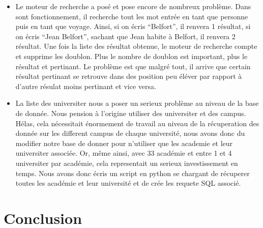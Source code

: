 \documentclass[a4paper,10pt]{report}
\begin{document}

\begin{itemize}
    \item Le moteur de recherche a pos\'e et pose encore de nombreux probl\`eme.
    Dans sont fonctionnement, il recherche tout les mot entr\'ee en tant que
    personne puis en tant que voyage. Ainsi, si on \'ecris ``Belfort'', il renvera 1 r\'esultat,
    si on \'ecris ``Jean Belfort'', sachant que Jean habite \`a Belfort, il renvera 2 r\'esultat.
    Une fois la liste des r\'esultat obtenue, le moteur de recherche compte et supprime
    les doublon. Plus le nombre de doublon est important, plus le r\'esultat et pertinant.
    Le probl\`eme est que malgr\'e tout, il arrive que certain r\'esultat pertinant se
    retrouve dans des position peu \'el\'ever par rapport \`a d'autre r\'esulat moins pertinant
    et vice versa.
    
    \null
    
    \item La liste des universiter nous a poser un serieux probl\`eme au niveau de la
    base de donn\'ee. Nous pension \`a l'origine utiliser des universiter et des campus.
    H\'elas, cela n\'ecessitait \'enormement de travail au niveau de la r\'ecuperation
    des donn\'ee sur les different campus de chaque universit\'e, nous avons donc du
    modifier notre base de donner pour n'utiliser que les academie et leur universiter
    associ\'ee. Or, m\^eme ainsi, avec 33 acad\'emie et entre 1 et 4 universiter par
    acad\'emie, cela representait un serieux investissement en temps. Nous avons donc
    \'ecris un script en python se chargant de r\'ecuperer toutes les acad\'emie et
    leur universit\'e et de cr\'ee les requete SQL associ\'e.
    
\end{itemize}




\chapter*{Conclusion}
\end{document}
